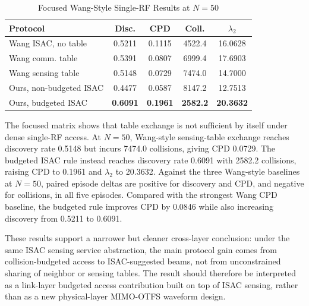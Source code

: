 \begin{table}[!t]
  \centering
  \caption{Focused Wang-Style Single-RF Results at \(N=50\)}
  \label{tab:wang_focused_n50}
  \begin{tabular}{lcccc}
    \toprule
    Protocol & Disc. & CPD & Coll. & \(\lambda_2\) \\
    \midrule
    Wang ISAC, no table & 0.5211 & 0.1115 & 4522.4 & 16.0628 \\
    Wang comm. table & 0.5391 & 0.0807 & 6999.4 & 17.6903 \\
    Wang sensing table & 0.5148 & 0.0729 & 7474.0 & 14.7000 \\
    Ours, non-budgeted ISAC & 0.4477 & 0.0587 & 8147.2 & 12.7513 \\
    Ours, budgeted ISAC & \textbf{0.6091} & \textbf{0.1961} & \textbf{2582.2} & \textbf{20.3632} \\
    \bottomrule
  \end{tabular}
\end{table}

The focused matrix shows that table exchange is not sufficient by itself under
dense single-RF access.  At \(N=50\), Wang-style sensing-table exchange reaches
discovery rate 0.5148 but incurs 7474.0 collisions, giving CPD 0.0729.  The
budgeted ISAC rule instead reaches discovery rate 0.6091 with 2582.2 collisions,
raising CPD to 0.1961 and \(\lambda_2\) to 20.3632.  Against the three
Wang-style baselines at \(N=50\), paired episode deltas are positive for
discovery and CPD, and negative for collisions, in all five episodes.  Compared
with the strongest Wang CPD baseline, the budgeted rule improves CPD by 0.0846
while also increasing discovery from 0.5211 to 0.6091.

These results support a narrower but cleaner cross-layer conclusion: under the
same ISAC sensing service abstraction, the main protocol gain comes from
collision-budgeted access to ISAC-suggested beams, not from unconstrained sharing
of neighbor or sensing tables.  The result should therefore be interpreted as a
link-layer budgeted access contribution built on top of ISAC sensing, rather
than as a new physical-layer MIMO-OTFS waveform design.
